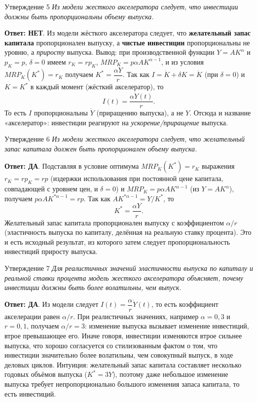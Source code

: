\documentclass[10pt,a4paper]{article}
\newcommand{\qda}{\textbf{\color{yesgreen}Ответ: ДА}}
\newcommand{\qnet}{\textbf{\color{nored}Ответ: НЕТ}}
\newenvironment{answer}[2]{%
  \begin{qbox}{Утверждение #1}
  \textit{#2}\par\smallskip
}{%
  \end{qbox}\vspace{2pt}
}
\begin{document}
\begin{answer}{5}{Из модели жесткого акселератора следует, что инвестиции должны быть пропорциональны объему выпуска.}
\qnet. Из модели жёсткого акселератора следует, что \textbf{желательный запас капитала} пропорционален выпуску, а \textbf{чистые инвестиции} пропорциональны не уровню, а \emph{приросту} выпуска. Вывод: при производственной функции $Y=AK^\alpha$ и $p_K=p$, $\delta=0$ имеем $r_K=rp_K$, $MRP_K=p\alpha AK^{\alpha-1}$, и из условия $MRP_K(K^*)=r_K$ получаем $K^*=\dfrac{\alpha Y}{r}$. Так как $I=\dot K+\delta K=\dot K$ (при $\delta=0$) и $K=K^*$ в каждый момент (жёсткий акселератор), то
\[
I(t)=\dfrac{\alpha\dot Y(t)}{r}.
\]
То есть $I$ пропорциональны $\dot Y$ (приращению выпуска), а не $Y$. Отсюда и название «акселератор»: инвестиции реагируют на \emph{ускорение/приращение} выпуска.
\end{answer}

\begin{answer}{6}{Из модели жесткого акселератора следует, что желательный запас капитала должен быть пропорционален объему выпуска.}
\qda. Подставляя в условие оптимума $MRP_K(K^*)=r_K$ выражения $r_K=rp_K=rp$ (издержки использования при постоянной цене капитала, совпадающей с уровнем цен, и $\delta=0$) и $MRP_K=p\alpha AK^{\alpha-1}$ (из $Y=AK^\alpha$), получаем $p\alpha AK^{*\alpha-1}=rp$. Так как $AK^{*\alpha-1}=Y/K^*$, то
\[
K^*=\dfrac{\alpha Y}{r}.
\]
Желательный запас капитала пропорционален выпуску с коэффициентом $\alpha/r$ (эластичность выпуска по капиталу, делённая на реальную ставку процента). Это и есть исходный результат, из которого затем следует пропорциональность инвестиций приросту выпуска.
\end{answer}

\begin{answer}{7}{Для реалистичных значений эластичности выпуска по капиталу и реальной ставки процента модель жесткого акселератора объясняет, почему инвестиции должны быть более волатильны, чем выпуск.}
\qda. Из модели следует $I(t)=\dfrac{\alpha}{r}\dot Y(t)$, то есть коэффициент акселерации равен $\alpha/r$. При реалистичных значениях, например $\alpha=0{,}3$ и $r=0{,}1$, получаем $\alpha/r=3$: изменение выпуска вызывает изменение инвестиций, втрое превышающее его. Иначе говоря, инвестиции изменяются втрое сильнее выпуска, что хорошо согласуется со стилизованным фактом о том, что инвестиции значительно более волатильны, чем совокупный выпуск, в ходе деловых циклов. Интуиция: желательный запас капитала составляет несколько годовых объёмов выпуска ($K^*=3Y$), поэтому даже небольшое изменение выпуска требует непропорционально большого изменения запаса капитала, то есть инвестиций.
\end{answer}
\end{document}
